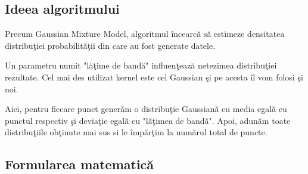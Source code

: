 \subsection{Ideea algoritmului}

Precum Gaussian Mixture Model, algoritmul încearcă să estimeze densitatea 
distribuţiei probabilităţii din care au fost generate datele.

Un parametru numit "lăţime de bandă" influenţează netezimea distribuţiei 
rezultate.
Cel mai des utilizat kernel este cel Gaussian şi pe acesta îl vom folosi şi noi.

Aici, pentru fiecare punct generăm o distribuţie Gaussiană cu media egală
cu punctul respectiv şi deviaţie egală cu "lăţimea de bandă". Apoi, adunăm toate 
distribuţiile obţinute mai sus si le împărţim la numărul total de puncte.

\subsection{Formularea matematică}
